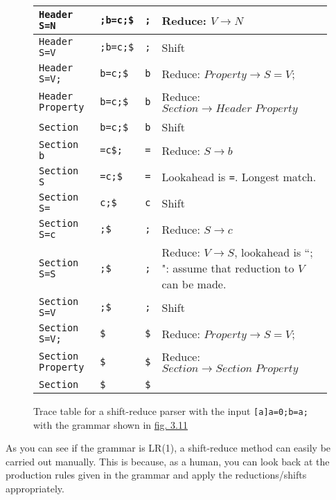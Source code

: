 \begin{figure}[H]
\begin{center}
\begin{tabular}{| m{3.5cm} | m{3cm} | m{2cm} | m{5cm} |}
            \verb|Header S=N| & \verb|;b=c;$| & \verb|;| & Reduce: $V \rightarrow N$\\
            \hline
            \verb|Header S=V| & \verb|;b=c;$| & \verb|;| & Shift\\
            \hline
            \verb|Header S=V;| & \verb|b=c;$| & \verb|b| & Reduce: $Property \rightarrow S = V;$\\
            \hline
            \verb|Header Property| & \verb|b=c;$| & \verb|b| & Reduce: $Section \rightarrow Header\;Property$\\
            \hline
            \verb|Section| & \verb|b=c;$| & \verb|b| & Shift\\
            \hline
            \verb|Section b| & \verb|=c$;| & \verb|=| & Reduce: $S \rightarrow b$\\
            \hline
            \verb|Section S| & \verb|=c;$| & \verb|=| & Lookahead is \verb|=|. Longest match.\\
            \hline
            \verb|Section S=| & \verb|c;$| & \verb|c| & Shift\\
            \hline
            \verb|Section S=c| & \verb|;$| & \verb|;| & Reduce: $S \rightarrow c$\\
            \hline
            \verb|Section S=S| & \verb|;$| & \verb|;| & Reduce: $V \rightarrow S$, lookahead is ``$;$": assume that reduction to $V$ can be made.\\
            \hline
            \verb|Section S=V| & \verb|;$| & \verb|;| & Shift\\
            \hline
            \verb|Section S=V;| & \verb|$| & \verb|$| & Reduce: $Property \rightarrow S = V;$\\
            \hline
            \verb|Section Property| & \verb|$| & \verb|$| & Reduce: $Section \rightarrow Section\;Property$\\
            \hline
            \verb|Section| & \verb|$| & \verb|$| & \\
            \hline
        \end{tabular}
    \end{center}
    \cprotect\caption{\label{fig:3.12}Trace table for a shift-reduce parser with the input \verb|[a]a=0;b=a;| with the grammar shown in \hyperref[fig:3.11]{fig. 3.11}}
\end{figure}

As you can see if the grammar is LR(1), a shift-reduce method can easily be carried out manually. This is because, as a human, you can look back at the production rules given in the grammar and apply the reductions/shifts appropriately.

